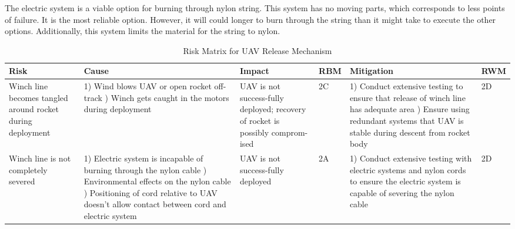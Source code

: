 		The electric system is a viable option for burning through nylon string. This system has no moving parts, which corresponds to less points of failure. It is the most reliable option. However, it will could longer to burn through the string than it might take to execute the other options. Additionally, this system limits the material for the string to nylon. 
		\begin{table}[H]
    \label{UAV Release Mechanism}
    {\footnotesize
    \caption{Risk Matrix for UAV Release Mechanism}
    \centering
    \begin{tabularx}{\linewidth}{XXXlXl}
    \toprule
    \textbf{Risk}                                            & \textbf{Cause}                                                                                                                 & \textbf{Impact}                                                                                                                           & \textbf{RBM}  & \textbf{Mitigation}                                                                                                                                                                                     & \textbf{RWM} \\
    \midrule
    Winch line becomes tangled around rocket during deployment & 1) Wind blows UAV or open rocket off-track \newline 2) Winch gets caught in the motors during deployment & UAV is not success-fully deployed; recovery of rocket is possibly comprom-ised & \cellcolor{orange!25} 2C & 1) Conduct extensive testing to ensure that release of winch line has adequate area \newline 2) Ensure using redundant systems that UAV is stable during descent from rocket body & \cellcolor{orange!25} 2D \\
    Winch line is not completely severed & 1) Electric system is incapable of burning through the nylon cable \newline 2) Environmental effects on the nylon cable \newline 3) Positioning of cord relative to UAV doesn’t allow contact between cord and electric system & UAV is not success-fully deployed & \cellcolor{red!25} 2A & 1) Conduct extensive testing with electric systems and nylon cords to ensure the electric system is capable of severing the nylon cable & \cellcolor{orange!25} 2D \\

\end{tabularx}}
\end{table}
